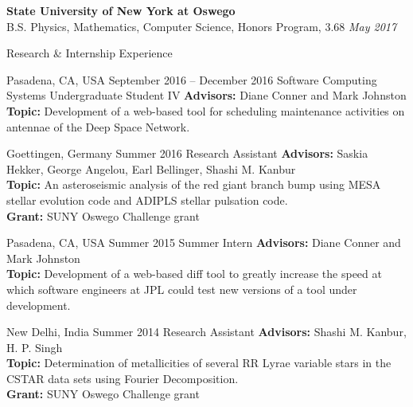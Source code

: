 \documentclass{resume} %
\begin{document}
\textbf{State University of New York at Oswego}
\\
B.S. Physics, Mathematics, Computer Science, Honors Program, 3.68
\hfill
\emph{May 2017}

\begin{rSection}{Research \& Internship Experience}{}

           {Pasadena, CA, USA}
           {September 2016 -- December 2016}
           {Software Computing Systems Undergraduate Student IV}
           {
    \textbf{Advisors:}
    Diane Conner and Mark Johnston
    \\
    \textbf{Topic:}
    Development of a web-based tool for scheduling maintenance activities on
    antennae of the Deep Space Network.
  }

           {Goettingen, Germany}
           {Summer 2016}
           {Research Assistant}
           {
    \textbf{Advisors:}
    Saskia Hekker, George Angelou, Earl Bellinger, Shashi M. Kanbur
    \\
    \textbf{Topic:}
    An asteroseismic analysis of the red giant branch bump using MESA stellar
    evolution code and ADIPLS stellar pulsation code.
    \\
    \textbf{Grant:}
    SUNY Oswego Challenge grant
  }

           {Pasadena, CA, USA}
           {Summer 2015}
           {Summer Intern}
           {
    \textbf{Advisors:}
    Diane Conner and Mark Johnston
    \\
    \textbf{Topic:}
    Development of a web-based diff tool to greatly increase the speed at which
    software engineers at JPL could test new versions of a tool under
    development.
  }

           {New Delhi, India}
           {Summer 2014}
           {Research Assistant}
           {
    \textbf{Advisors:}
    Shashi M. Kanbur, H. P. Singh
    \\
    \textbf{Topic:}
    Determination of metallicities of several RR Lyrae variable stars in the
    CSTAR data sets using Fourier Decomposition.
    \\
    \textbf{Grant:}
    SUNY Oswego Challenge grant
  }

\end{rSection}
\end{document}
